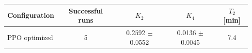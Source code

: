\begin{tabular}{lcccc}
\toprule
Configuration & Successful runs & $K_2$ & $K_4$ & $T_2$ [min] \\
\midrule
PPO optimized & 5 & 0.2592 $\pm$ 0.0552 & 0.0136 $\pm$ 0.0045 & 7.4 \\
\bottomrule
\end{tabular}
